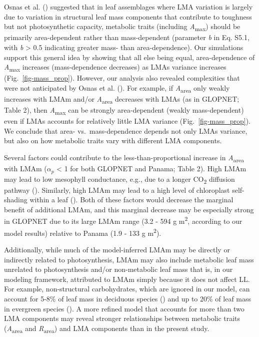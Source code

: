 \documentclass[
  12pt,
  letterpaper,
  DIV=11,
  numbers=noendperiod]{scrartcl}
\begin{document}
Osnas et al. () suggested that in leaf
assemblages where LMA variation is largely due to variation in
structural leaf mass components that contribute to toughness but not
photosynthetic capacity, metabolic traits (including
\emph{A}\textsubscript{max}) should be primarily area-dependent rather
than mass-dependent (parameter \emph{b} in Eq. S5.1, with \emph{b}
\textgreater{} 0.5 indicating greater mass- than area-dependence). Our
simulations support this general idea by showing that all else being
equal, area-dependence of \emph{A}\textsubscript{max} increases
(mass-dependence decreases) as LMAs variance increases
(Fig.~\ref{fig-mass_prop}). However, our analysis also revealed
complexities that were not anticipated by Osnas et al.
(). For example, if
\emph{A}\textsubscript{area} only weakly increases with LMAm and/or
\emph{A}\textsubscript{area} decreases with LMAs (as in GLOPNET; Table
2), then \emph{A}\textsubscript{max} can be strongly area-dependent
(weakly mass-dependent) even if LMAs accounts for relatively little LMA
variance (Fig.~\ref{fig-mass_prop}). We conclude that area-
vs.~mass-dependence depends not only LMAs variance, but also on how
metabolic traits vary with different LMA components.

Several factors could contribute to the less-than-proportional increase
in \emph{A}\textsubscript{area} with LMAm (\(\alpha_p\) \textless{} 1
for both GLOPNET and Panama; Table 2). High LMAm may lead to low
mesophyll conductance, e.g., due to a longer CO\textsubscript{2}
diffusion pathway ().
Similarly, high LMAm may lead to a high level of chloroplast
self-shading within a leaf (). Both of these factors would decrease the marginal benefit of
additional LMAm, and this marginal decrease may be especially strong in
GLOPNET due to its large LMAm range (3.2 - 594 g m\textsuperscript{2},
according to our model results) relative to Panama (1.9 - 133 g
m\textsuperscript{2}).

Additionally, while much of the model-inferred LMAm may be directly or
indirectly related to photosynthesis, LMAm may also include metabolic
leaf mass unrelated to photosynthesis and/or non-metabolic leaf mass
that is, in our modeling framework, attributed to LMAm simply because it
does not affect LL. For example, non-structural carbohydrates, which are
ignored in our model, can account for 5-8\% of leaf mass in deciduous
species () and up to 20\% of
leaf mass in evergreen species
(). A
more refined model that accounts for more than two LMA components may
reveal stronger relationships between metabolic traits
(\emph{A}\textsubscript{area} and \emph{R}\textsubscript{area}) and LMA
components than in the present study.
\end{document}
